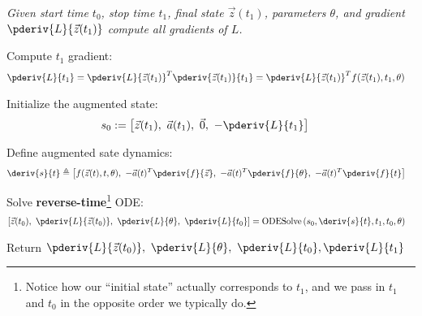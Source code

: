 \documentclass[11pt]{article}
\begin{document}
\begin{algorithm}
	{\small\itshape 
		Given start time $t_0$, stop time $t_1$, final state $\vec{z}(t_1)$, parameters $\theta$, and gradient $\pderiv{L}{\vec{z}(t_1)}$ compute all gradients of $L$. 
}
	
	\tcblower 
	
	\begin{compactenum}
		\item Compute $t_1$ gradient:
		\begin{align}
			\pderiv{L}{t_1}
				&= \pderiv{L}{\vec{z}(t_1)}^T \pderiv{\vec{z}(t_1)}{t_1}
				=  \pderiv{L}{\vec{z}(t_1)}^T f(\vec z (t_1), t_1, \theta)
		\end{align}
		
		\item Initialize the augmented state:
		\begin{align}
			s_0
				&:= \left[
					\vec z (t_1),~
					\vec a (t_1),~
					\vec 0,~
					- \pderiv{L}{t_1}
				\right]
		\end{align}
		
		
		\item Define augmented sate dynamics:
		\begin{align}
			\deriv{ s }{ t }
				&\triangleq \left[
					f(\vec z (t), t, \theta),~
					-\vec a (t)^T \pderiv{f}{\vec z},~
					-\vec a (t)^T \pderiv{f}{\theta},~
					-\vec a (t)^T \pderiv{f}{t}
				\right]
		\end{align}
		
		\item Solve \textbf{reverse-time}\footnote{Notice how our ``initial state'' actually corresponds to $t_1$, and we pass in $t_1$ and $t_0$ in the opposite order we typically do.} ODE:
		\begin{align}
			\left[
				\vec z (t_0),~
				\pderiv{L}{\vec z (t_0)},~
				\pderiv{L}{\theta},~
				\pderiv{L}{t_0}
			\right]
				&= \text{ODESolve}\left(
					s_0, \deriv{s}{t}, t_1, t_0, \theta
				\right)
		\end{align}
		
		\item Return $	\pderiv{L}{\vec z (t_0)},~\pderiv{L}{\theta},~\pderiv{L}{t_0}, \pderiv{L}{t_1} $
	\end{compactenum}
\end{algorithm}
\end{document}
